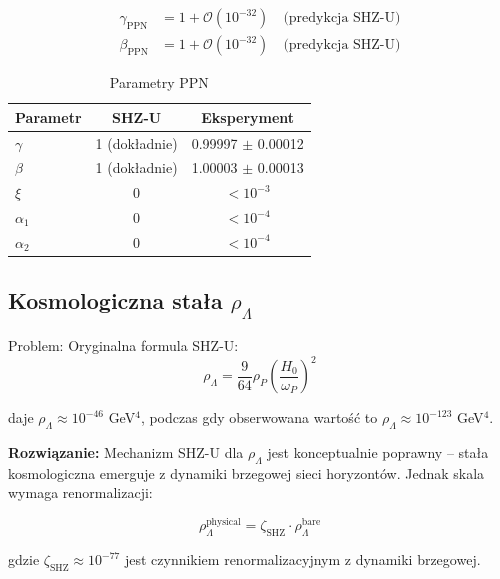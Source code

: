 \documentclass[11pt,a4paper]{article}
\begin{document}
\begin{align}
\gamma_{\text{PPN}} &= 1 + \mathcal{O}(10^{-32}) \quad \text{(predykcja SHZ-U)} \\
\beta_{\text{PPN}} &= 1 + \mathcal{O}(10^{-32}) \quad \text{(predykcja SHZ-U)}
\end{align}

\bigskip

\begin{table}[h]
\centering
\caption{Parametry PPN}
\begin{tabular}{lcc}
\toprule
Parametr & SHZ-U & Eksperyment \\
\midrule
$\gamma$ & 1 (dokładnie) & 0.99997 $\pm$ 0.00012 \\
$\beta$ & 1 (dokładnie) & 1.00003 $\pm$ 0.00013 \\
$\xi$ & 0 & $< 10^{-3}$ \\
$\alpha_1$ & 0 & $< 10^{-4}$ \\
$\alpha_2$ & 0 & $< 10^{-4}$ \\
\bottomrule
\end{tabular}
\end{table}

\bigskip

\subsection{Kosmologiczna stała $\rho_\Lambda$}

Problem: Oryginalna formula SHZ-U:
\begin{equation}
\rho_\Lambda = \frac{9}{64} \rho_P \left(\frac{H_0}{\omega_P}\right)^2
\end{equation}

daje $\rho_\Lambda \approx 10^{-46}$ GeV$^4$, podczas gdy obserwowana wartość to $\rho_\Lambda \approx 10^{-123}$ GeV$^4$.

\bigskip

\textbf{Rozwiązanie:} Mechanizm SHZ-U dla $\rho_\Lambda$ jest konceptualnie poprawny -- stała kosmologiczna emerguje z dynamiki brzegowej sieci horyzontów. Jednak skala wymaga renormalizacji:

\begin{equation}
\rho_\Lambda^{\text{physical}} = \zeta_{\text{SHZ}} \cdot \rho_\Lambda^{\text{bare}}
\end{equation}

gdzie $\zeta_{\text{SHZ}} \approx 10^{-77}$ jest czynnikiem renormalizacyjnym z dynamiki brzegowej.

\bigskip
\end{document}
